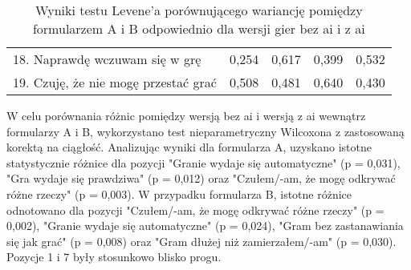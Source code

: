 \begin{table}[!h]
\begin{center}
\begin{tabular}{|m{10em}|m{5em}|m{5em}|m{5em}|m{5em}|}
            18. Naprawdę wczuwam się w grę                                    & 0,254                             & 0,617                  & 0,399                         & 0,532              \\
            19. Czuję, że nie mogę przestać grać                              & 0,508                             & 0,481                  & 0,640                         & 0,430              \\
            \hline
        \end{tabular}
    \end{center}
    \caption{Wyniki testu Levene'a porównującego wariancję pomiędzy formularzem A i B odpowiednio dla wersji gier bez \gls{ai} i z \gls{ai}}\label{tab1:ch7_12}
\end{table}

\clearpage

W celu porównania różnic pomiędzy wersją bez \gls{ai} i wersją z \gls{ai} wewnątrz formularzy A i B, wykorzystano test
nieparametryczny Wilcoxona z zastosowaną korektą na ciągłość. Analizując wyniki dla formularza A, uzyskano istotne statystycznie różnice dla
pozycji "Granie wydaje się automatyczne" (p = 0,031), "Gra wydaje się prawdziwa" (p = 0,012) oraz "Czułem/-am, że
mogę odkrywać różne rzeczy" (p = 0,003). W przypadku formularza B, istotne różnice odnotowano dla pozycji
"Czułem/-am, że mogę odkrywać różne rzeczy" (p = 0,002), "Granie wydaje się automatyczne" (p = 0,024),
"Gram bez zastanawiania się jak grać" (p = 0,008) oraz "Gram dłużej niż zamierzałem/-am" (p = 0,030). Pozycje 1 i 7
były stosunkowo blisko progu.

